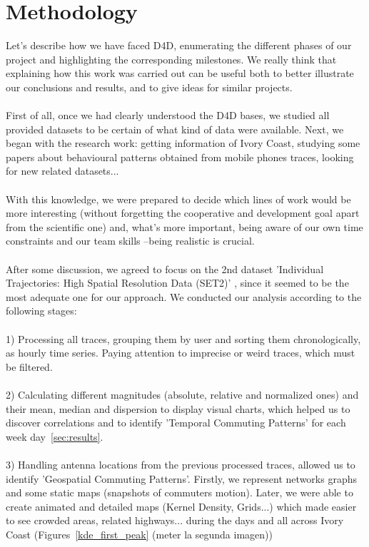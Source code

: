 \newpage

\section{Methodology}

Let's describe how we have faced D4D, enumerating the different phases of our project and highlighting the corresponding milestones. We really think that explaining how this work was carried out can be useful both to better illustrate our conclusions and results, and to give ideas for similar projects.
\\
\\
First of all, once we had clearly understood the D4D bases, we studied all provided datasets to be certain of what kind of data were available. Next, we began with the research work: getting information of Ivory Coast, studying some papers about behavioural patterns obtained from mobile phones traces, looking for new related datasets...
\\
\\
With this knowledge, we were prepared to decide which lines of work would be more interesting (without forgetting the cooperative and development goal apart from the scientific one) and, what's more important, being aware of our own time constraints and our team skills --being realistic is crucial.
\\
\\
After some discussion, we agreed to focus on the 2nd dataset 'Individual Trajectories: High Spatial Resolution Data (SET2)' \citep{DBLP:journals/corr/abs-1210-0137} , since it seemed to be the most adequate one for our approach. We conducted our analysis according to the following stages:
\\
\\
1) Processing all traces, grouping them by user and sorting them chronologically, as hourly time series. Paying attention to imprecise or weird traces, which must be filtered.
\\
\\
2) Calculating different magnitudes (absolute, relative and normalized ones) and their mean, median and dispersion to display visual charts, which helped us to discover correlations and to identify 'Temporal Commuting Patterns' for each week day~\ref{sec:results}.
\\
\\
3) Handling antenna locations from the previous processed traces, allowed us to identify 'Geospatial Commuting Patterns'. Firstly, we represent networks graphs and some static maps (snapshots of commuters motion). Later, we were able to create animated and detailed maps (Kernel Density, Grids...) which made easier to see crowded areas, related highways... during the days and all across Ivory Coast (Figures~\ref{kde_first_peak} (meter la segunda imagen))
